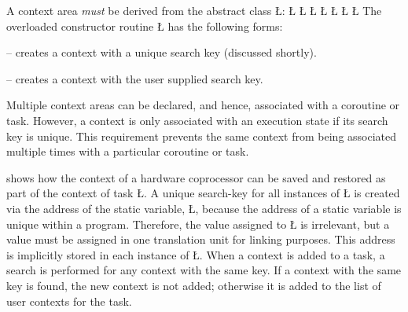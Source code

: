 \documentclass[openright,twoside]{report}
\begin{document}
A context area \emph{must} be derived from the abstract class \LGinlinetrue\LGbegin\lgrinde\L{}\endlgrinde\LGend{}:
\LGinlinefalse\LGbegin\lgrinde
\L{}
\L{}
\L{\LB{}}
\L{\LB{}}
\L{\LB{}}
\L{\LB{}}
\L{}
\CE{}\endlgrinde\LGend
The overloaded constructor routine \LGinlinetrue\LGbegin\lgrinde\L{}\endlgrinde\LGend{} has the following forms:
\begin{prefix}
\item[\LGinlinetrue\LGbegin\lgrinde\L{\LB{\V{uContext}()}}\endlgrinde\LGend{}]
-- creates a context with a unique search key (discussed shortly).

\item[\LGinlinetrue\LGbegin\lgrinde\L{\LB{\V{uContext}(\0\K{void}\0\*\V{key}\0)}}\endlgrinde\LGend{}]
-- creates a context with the user supplied search key.
\end{prefix}
Multiple context areas can be declared, and hence, associated with a coroutine or task.
However, a context is only associated with an execution state if its search key is unique.
This requirement prevents the same context from being associated multiple times with a particular coroutine or task.

 shows how the context of a hardware coprocessor can be saved and restored as part of the context of task \LGinlinetrue\LGbegin\lgrinde\L{}\endlgrinde\LGend{}.
A unique search-key for all instances of \LGinlinetrue\LGbegin\lgrinde\L{}\endlgrinde\LGend{} is created via the address of the static variable, \LGinlinetrue\LGbegin\lgrinde\L{}\endlgrinde\LGend{}, because the address of a static variable is unique within a program.
Therefore, the value assigned to \LGinlinetrue\LGbegin\lgrinde\L{}\endlgrinde\LGend{} is irrelevant, but a value must be assigned in one translation unit for linking purposes.
This address is implicitly stored in each instance of \LGinlinetrue\LGbegin\lgrinde\L{}\endlgrinde\LGend{}.
When a context is added to a task, a search is performed for any context with the same key.
If a context with the same key is found, the new context is not added;
otherwise it is added to the list of user contexts for the task.
\end{document}
